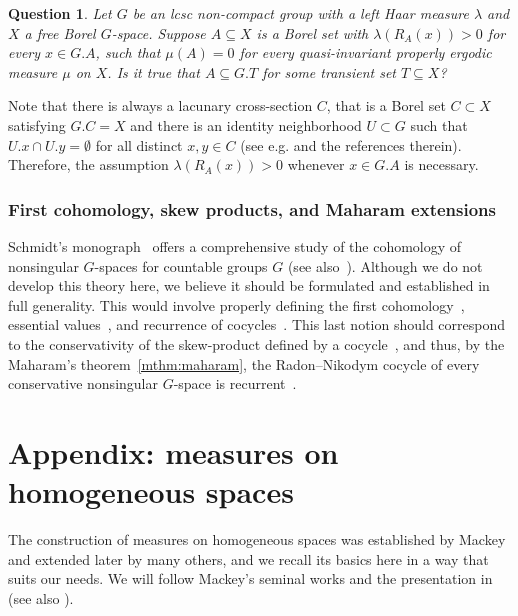\documentclass{amsart}
\numberwithin{equation}{subsection}
\newtheorem{que}[thm]{Question}
\begin{document}
\begin{que}
Let \(G\) be an lcsc non-compact group with a left Haar measure \(\lambda\) and \(X\) a free Borel \(G\)-space. Suppose \(A\subseteq X\) is a Borel set with \(\lambda\left(R_{A}\left(x\right)\right)>0\) for every \(x\in G.A\), such that \(\mu\left(A\right)=0\) for every quasi-invariant properly ergodic measure \(\mu\) on \(X\). Is it true that \(A\subseteq G.T\) for some transient set \(T\subseteq X\)?
\end{que}

Note that there is always a lacunary cross-section \(C\), that is a Borel set \(C\subset X\) satisfying \(G.C=X\) and there is an identity neighborhood \(U\subset G\) such that \(U.x\cap U.y=\emptyset\) for all distinct \(x,y\in C\) (see e.g. \cite[\S2]{slutsky2017lebesgue} and the references therein). Therefore, the assumption \(\lambda\left(R_{A}\left(x\right)\right)>0\) whenever \(x\in G.A\) is necessary.

\subsubsection{First cohomology, skew products, and Maharam extensions}

Schmidt’s monograph~\cite{schmidt1977cocycles} offers a comprehensive study of the cohomology of nonsingular \(G\)-spaces for countable groups \(G\) (see also~\cite[\S8]{aaronson1997introduction}). Although we do not develop this theory here, we believe it should be formulated and established in full generality. This would involve properly defining the first cohomology~\cite[\S2]{schmidt1977cocycles}, essential values~\cite[\S3]{schmidt1977cocycles}, and recurrence of cocycles~\cite[Definition~3.13]{schmidt1977cocycles}. This last notion should correspond to the conservativity of the skew-product defined by a cocycle~\cite[\S5]{schmidt1977cocycles}, and thus, by the Maharam's theorem~\ref{mthm:maharam}, the Radon--Nikodym cocycle of every conservative nonsingular \(G\)-space is recurrent~\cite[\S4]{schmidt1977cocycles}.

\section*{Appendix: measures on homogeneous spaces}
\label{Appendix: Measures on Homogeneous Spaces}

The construction of measures on homogeneous spaces was established by Mackey \cite[\S1]{mackey1952induced} and extended later by many others, and we recall its basics here in a way that suits our needs. We will follow Mackey's seminal works \cite{mackey1952induced, mackey1957borel} and the presentation in \cite[\S2.6]{folland1995course} (see also \cite[Chapter V, \S4]{varadarajan1968geometry}).
\end{document}

